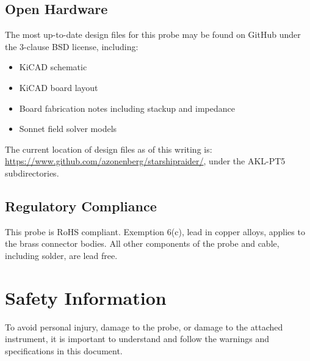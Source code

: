 \documentclass[11pt]{article}
\begin{document}
\subsection{Open Hardware}

The most up-to-date design files for this probe may be found on GitHub under the 3-clause BSD license, including:

\begin{itemize}
\item KiCAD schematic
\item KiCAD board layout
\item Board fabrication notes including stackup and impedance
\item Sonnet field solver models
\end{itemize}

The current location of design files as of this writing is:
\url{https://www.github.com/azonenberg/starshipraider/}, under the AKL-PT5 subdirectories.

\subsection{Regulatory Compliance}

This probe is RoHS compliant. Exemption 6(c), lead in copper alloys, applies to the brass connector bodies. All other
components of the probe and cable, including solder, are lead free.

\pagebreak
\section{Safety Information}

To avoid personal injury, damage to the probe, or damage to the attached instrument, it is important to understand and
follow the warnings and specifications in this document.
\end{document}
